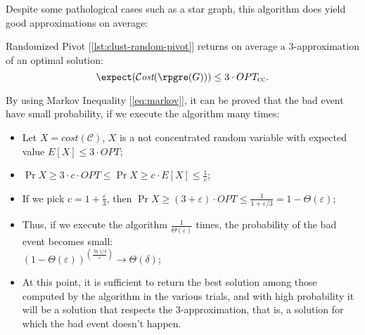 Despite some pathological cases such as a star graph, this algorithm does yield good approximations on average:

\begin{theorem}\label{thm:clust-rp-approx}
    Randomized Pivot [\ref{lst:clust-random-pivot}] returns on average a 3-approximation of an optimal solution:
    \[
        \expect(\cost(\rpgre(G))) \leq 3 \cdot OPT_\textsc{cc}.
    \]
\end{theorem}

\begin{observation}\label{obs:clust-4}
    By using Markov Inequality [\ref{eq:markov}], it can be proved that the bad event have small probability, if we execute the algorithm many times:
    \begin{itemize}
        \item Let $X=cost(\mathscr{C})$, $X$ is a not concentrated random variable with expected value $E[X] \leq 3 \cdot OPT$;
        \item $\Pr{X \geq 3 \cdot c \cdot OPT} \leq \Pr{X \geq c \cdot E[X]} \leq \frac{1}{c}$;
        \item If we pick $c=1+\frac{\varepsilon}{3}$, then $\Pr{X \geq (3 + \varepsilon) \cdot OPT} \leq \frac{1}{1 + \varepsilon / 3} = 1 - \Theta(\varepsilon)$;
        \item Thus, if we execute the algorithm $\frac{1}{\Theta(\varepsilon)}$ times, the probability of the bad event becomes small:\\
        $\left( 1 - \Theta(\varepsilon) \right)^{\left( \frac{\ln 1/\delta}{\varepsilon} \right)} \to \Theta(\delta)$;
        \item At this point, it is sufficient to return the best solution among those computed by the algorithm in the various trials, and with high probability it will be a solution that respects the 3-approximation, that is, a solution for which the bad event doesn't happen.
    \end{itemize}
\end{observation}

